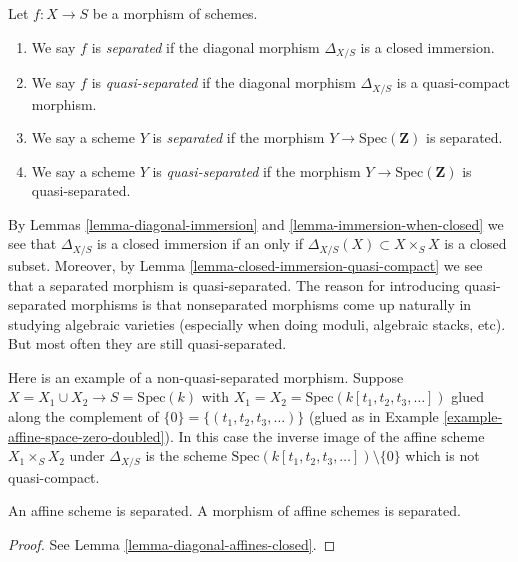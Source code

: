 \begin{definition}
\label{definition-separated}
Let $f : X \to S$ be a morphism of schemes.
\begin{enumerate}
\item We say $f$ is {\it separated} if the diagonal morphism $\Delta_{X/S}$
is a closed immersion.
\item We say $f$ is {\it quasi-separated} if the diagonal morphism
$\Delta_{X/S}$ is a quasi-compact morphism.
\item We say a scheme $Y$ is {\it separated} if the morphism
$Y \to \text{Spec}(\mathbf{Z})$ is separated.
\item We say a scheme $Y$ is {\it quasi-separated} if the morphism
$Y \to \text{Spec}(\mathbf{Z})$ is quasi-separated.
\end{enumerate}
\end{definition}

\noindent
By Lemmas \ref{lemma-diagonal-immersion} and \ref{lemma-immersion-when-closed}
we see that $\Delta_{X/S}$ is a closed immersion if an only if
$\Delta_{X/S}(X) \subset X\times_S X$ is a closed subset. Moreover,
by Lemma \ref{lemma-closed-immersion-quasi-compact} we see that a
separated morphism is quasi-separated. The reason for introducing
quasi-separated morphisms is that nonseparated morphisms come up naturally
in studying algebraic varieties (especially when doing moduli,
algebraic stacks, etc). But most often they are still quasi-separated.

\begin{example}
\label{example-not-quasi-separated}
Here is an example of a non-quasi-separated morphism.
Suppose $X = X_1 \cup X_2 \to S = \text{Spec}(k)$ with 
$X_1 = X_2 = \text{Spec}(k[t_1, t_2, t_3, \ldots])$
glued along the complement of $\{0\} = \{(t_1, t_2, t_3, \ldots)\}$
(glued as in Example \ref{example-affine-space-zero-doubled}).
In this case the inverse image of the affine scheme
$X_1 \times_S X_2$ under $\Delta_{X/S}$ is the scheme
$\text{Spec}(k[t_1, t_2, t_3, \ldots]) \setminus \{0\}$
which is not quasi-compact.
\end{example}

\begin{lemma}
\label{lemma-affine-separated}
An affine scheme is separated.
A morphism of affine schemes is separated.
\end{lemma}

\begin{proof}
See Lemma \ref{lemma-diagonal-affines-closed}.
\end{proof}

